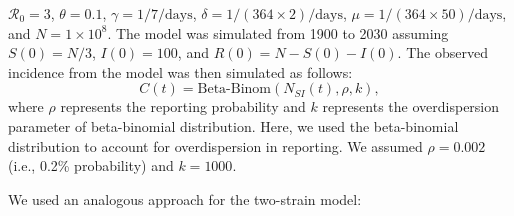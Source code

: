 \documentclass[12pt]{article}
\begin{document}
$\mathcal R_0 = 3$, $\theta = 0.1$, $\gamma = 1/7/\mathrm{days}$, $\delta = 1/(364\times 2)/\mathrm{days}$,
$\mu =1/(364\times 50)/\mathrm{days}$, and $N = 1 \times 10^{8}$.
The model was simulated from 1900 to 2030 assuming $S(0) = N/3$, $I(0) = 100$, and $R(0) = N - S(0) - I(0)$.
The observed incidence from the model was then simulated as follows:
\begin{equation}
C(t) = \textrm{Beta-Binom}(N_{SI}(t), \rho, k), 
\end{equation}
where $\rho$ represents the reporting probability and $k$ represents the overdispersion parameter of beta-binomial distribution.
Here, we used the beta-binomial distribution to account for overdispersion in reporting.
We assumed $\rho = 0.002$ (i.e., 0.2\% probability) and $k = 1000$.

We used an analogous approach for the two-strain model:
\end{document}
